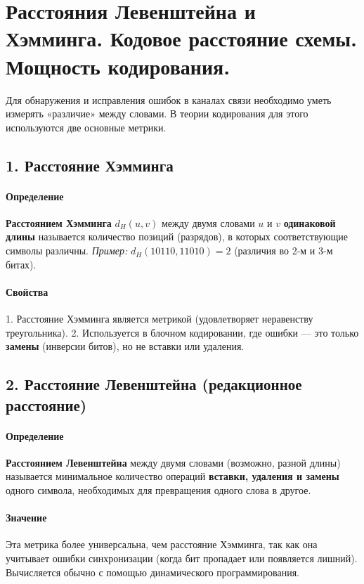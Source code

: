 \section{Расстояния Левенштейна и Хэмминга. Кодовое расстояние схемы. Мощность кодирования.}

Для обнаружения и исправления ошибок в каналах связи необходимо уметь измерять «различие» между словами. В теории кодирования для этого используются две основные метрики.

\subsection*{1. Расстояние Хэмминга}

\paragraph{Определение}
\textbf{Расстоянием Хэмминга} $d_H(u, v)$ между двумя словами $u$ и $v$ \textbf{одинаковой длины} называется количество позиций (разрядов), в которых соответствующие символы различны.
\textit{Пример:} $d_H(10110, 11010) = 2$ (различия во 2-м и 3-м битах).

\paragraph{Свойства}
1. Расстояние Хэмминга является метрикой (удовлетворяет неравенству треугольника).
2. Используется в блочном кодировании, где ошибки — это только \textbf{замены} (инверсии битов), но не вставки или удаления.

\subsection*{2. Расстояние Левенштейна (редакционное расстояние)}

\paragraph{Определение}
\textbf{Расстоянием Левенштейна} между двумя словами (возможно, разной длины) называется минимальное количество операций \textbf{вставки, удаления и замены} одного символа, необходимых для превращения одного слова в другое.

\paragraph{Значение}
Эта метрика более универсальна, чем расстояние Хэмминга, так как она учитывает ошибки синхронизации (когда бит пропадает или появляется лишний). Вычисляется обычно с помощью динамического программирования.

